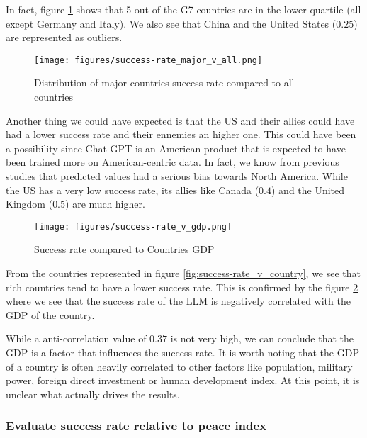 In fact, figure \ref{fig:success-rate_major_v_all} shows that 5 out of the G7 countries are in the lower quartile (all except Germany and Italy). We also see that China and the United States ($0.25$) are represented as outliers.

\begin{figure}[H]
    \texttt{[image: figures/success-rate\_major\_v\_all.png]}
    \caption[Plot of the success rate distribution of major countries compared to the distribution of all countries]{Distribution of major countries success rate compared to all countries}
    \label{fig:success-rate_major_v_all}
\end{figure}

Another thing we could have expected is that the US and their allies could have had a lower success rate and their ennemies an higher one. This could have been a possibility since Chat GPT is an American product that is expected to have been trained more on American-centric data. In fact, we know from previous studies that predicted values had a serious bias towards North America\cite{li-etal-2022-herb}\cite{yu2023largelanguagemodelattributed}. While the US has a very low success rate, its allies like Canada ($0.4$) and the United Kingdom ($0.5$) are much higher.

\begin{figure}[H]
    \texttt{[image: figures/success-rate\_v\_gdp.png]}
    \caption[Plot of success rate of countries based on their GDP]{Success rate compared to Countries GDP \cite{worldbank:gdp}}
    \label{fig:success-rate_v_gdp}
\end{figure}

From the countries represented in figure \ref{fig:success-rate_v_country}, we see that rich countries tend to have a lower success rate. This is confirmed by the figure \ref{fig:success-rate_v_gdp} where we see that the success rate of the LLM is negatively correlated with the GDP of the country.

While a anti-correlation value of $0.37$ is not very high, we can conclude that the GDP is a factor that influences the success rate. It is worth noting that the GDP of a country is often heavily correlated to other factors like population, military power, foreign direct investment\cite{Dinu2015INFORMATICMU} or human development index\cite{Sajith2020ApplicabilityOH}. At this point, it is unclear what actually drives the results.

\subsubsection{Evaluate success rate relative to peace index}

